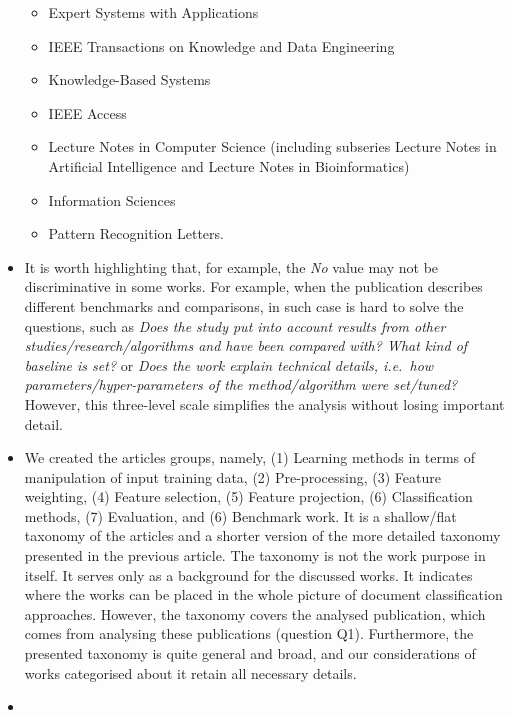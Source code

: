 \documentclass[
]{article}
\providecommand{\tightlist}{%
  \setlength{\itemsep}{0pt}\setlength{\parskip}{0pt}}
\begin{document}
\begin{itemize}
  \begin{itemize}
  \tightlist
  \item
    Expert Systems with Applications
  \item
    IEEE Transactions on Knowledge and Data Engineering
  \item
    Knowledge-Based Systems
  \item
    IEEE Access
  \item
    Lecture Notes in Computer Science (including subseries Lecture Notes in Artificial Intelligence and Lecture Notes in Bioinformatics)
  \item
    Information Sciences
  \item
    Pattern Recognition Letters.
  \end{itemize}
\item
  It is worth highlighting that, for example, the \emph{No} value may not be discriminative in some works. For example, when the publication describes different benchmarks and comparisons, in such case is hard to solve the questions, such as \emph{Does the study put into account results from other studies/research/algorithms and have been compared with? What kind of baseline is set?} or \emph{Does the work explain technical details, i.e.~how parameters/hyper-parameters of the method/algorithm were set/tuned?} However, this three-level scale simplifies the analysis without losing important detail.
\item
  We created the articles groups, namely, (1) Learning methods in terms of manipulation of input training data, (2) Pre-processing, (3) Feature weighting, (4) Feature selection, (5) Feature projection, (6) Classification methods, (7) Evaluation, and (6) Benchmark work. It is a shallow/flat taxonomy of the articles and a shorter version of the more detailed taxonomy presented in the previous article. The taxonomy is not the work purpose in itself. It serves only as a background for the discussed works. It indicates where the works can be placed in the whole picture of document classification approaches. However, the taxonomy covers the analysed publication, which comes from analysing these publications (question Q1). Furthermore, the presented taxonomy is quite general and broad, and our considerations of works categorised about it retain all necessary details.
\item

\end{itemize}
\end{document}
